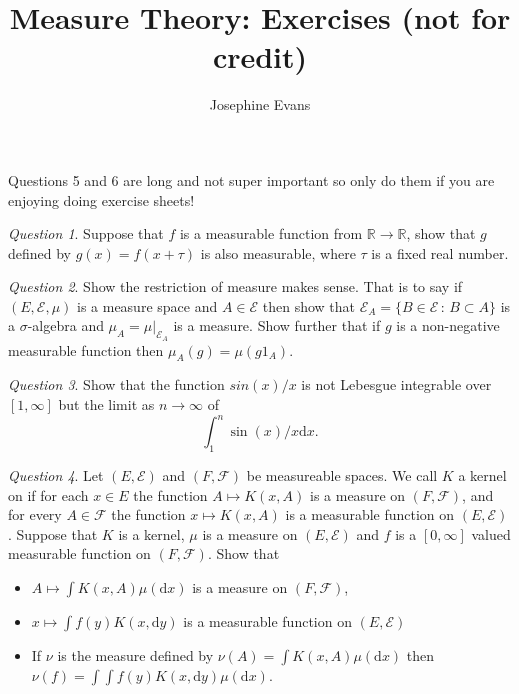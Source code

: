 \documentclass[11pt]{article}
\author{
Josephine Evans
}
\title{Measure Theory: Exercises (not for credit)}
\theoremstyle{definition}
\theoremstyle{remark}
\newtheorem{q}{Question}
\begin{document}
\maketitle
Questions 5 and 6 are long and not super important so only do them if you are enjoying doing exercise sheets!

\begin{q}
Suppose that $f$ is a measurable function from $\mathbb{R} \rightarrow \mathbb{R}$, show that $g$ defined by $g(x) = f(x+\tau)$ is also measurable, where $\tau$ is a fixed real number.
\end{q}


\begin{q}
Show the restriction of measure makes sense. That is to say if $(E, \mathcal{E}, \mu)$ is a measure space and $A \in \mathcal{E}$ then show that $\mathcal{E}_A = \{ B  \in \mathcal{E} \,:\, B \subset A\}$ is a $\sigma$-algebra and $\mu_A = \mu|_{\mathcal{E}_A}$ is a measure. Show further that if $g$ is a non-negative measurable function then $\mu_A(g) = \mu(g1_A)$. 
\end{q}

\begin{q}
Show that the function $sin(x)/x$ is not Lebesgue integrable over $[1,\infty]$ but the limit as $n \rightarrow \infty$ of 
\[ \int_1^n \sin(x)/x \mathrm{d}x. \]
\end{q}

\begin{q}
 Let $(E, \mathcal{E})$ and $(F, \mathcal{F})$ be measureable spaces. We call $K$ a kernel on if for each $x \in E$ the function $A \mapsto K(x, A)$ is a measure on $(F, \mathcal{F})$, and for every $A \in \mathcal{F}$ the function $x \mapsto K(x,A)$ is a measurable function on $(E, \mathcal{E})$. Suppose that $K$ is a kernel, $\mu$ is a measure on $(E, \mathcal{E})$ and $f$ is a $[0,\infty]$ valued measurable function on $(F, \mathcal{F})$. Show that
\begin{itemize}
\item $A \mapsto \int K(x,A) \mu(\mathrm{d}x)$ is a measure on $(F, \mathcal{F})$,
\item $x \mapsto \int f(y) K(x, \mathrm{d}y)$ is a measurable function on $(E, \mathcal{E})$ 
\item If $\nu$ is the measure defined by $\nu(A) = \int K(x,A) \mu(\mathrm{d}x)$ then $\nu(f) = \int \int f(y) K(x, \mathrm{d}y) \mu(\mathrm{d}x)$. 
\end{itemize}
\end{q}
\end{document}
